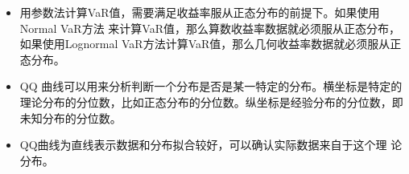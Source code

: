 \begin{itemize}
    

    \item 用参数法计算VaR值，需要满足收益率服从正态分布的前提下。如果使用Normal VaR方法
来计算VaR值，那么算数收益率数据就必须服从正态分布，如果使用Lognormal
VaR方法计算VaR值，那么几何收益率数据就必须服从正态分布。

\item QQ 曲线可以用来分析判断一个分布是否是某一特定的分布。横坐标是特定的理论分布的分位数，比如正态分布的分位数。纵坐标是经验分布的分位数，即未知分布的分位数。


\item QQ曲线为直线表示数据和分布拟合较好，可以确认实际数据来自于这个理
论分布。
\end{itemize}



